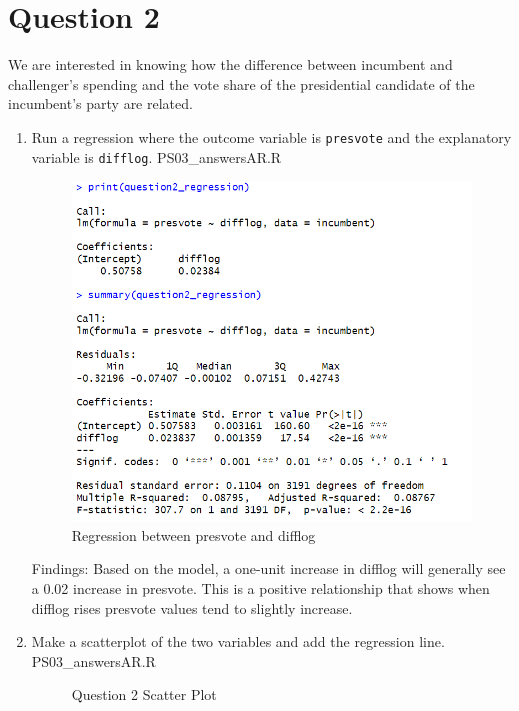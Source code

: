 \documentclass[12pt,letterpaper]{article}
\begin{document}
\section*{Question 2}
\noindent We are interested in knowing how the difference between incumbent and challenger's spending and the vote share of the presidential candidate of the incumbent's party are related.	\vspace{.25cm}
	\begin{enumerate}
		\item Run a regression where the outcome variable is \texttt{presvote} and the explanatory variable is \texttt{difflog}.	
		 {PS03_answersAR.R}
		\begin{figure}[h!]\centering
			\caption{\footnotesize Regression between presvote and difflog}
			\label{}
			\includegraphics[width=.85\textwidth]{question2_regression.png}
		\end{figure}
		Findings: Based on the model, a one-unit increase in difflog will generally see a 0.02 increase in presvote. This is a positive relationship that shows when difflog rises presvote values tend to slightly increase.
		\vspace{5cm}
		\item Make a scatterplot of the two variables and add the regression line. 	
		 {PS03_answersAR.R}
		\begin{figure}[h!]\centering
			\caption{\footnotesize Question 2 Scatter Plot}
			\label{}

\end{figure}
\end{enumerate}
\end{document}
